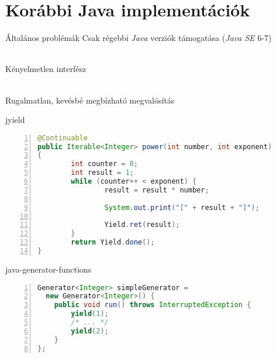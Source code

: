 \section{Korábbi Java implementációk}

\begin{frame}{Általános problémák}
Csak régebbi \textit{Java} verziók támogatása (\textit{Java SE} 6-7)


\hfill \\

\pause
Kényelmetlen interfész


\hfill \\

\pause
Rugalmatlan, kevésbé megbízható megvalósítás
\end{frame}


\begin{frame}[fragile]{jyield}
\begin{center}
\begin{lstlisting}[language=java, xleftmargin=15pt,
        basicstyle=\scriptsize,
        numbers=left,
        numbersep=5pt, escapechar=!]
@Continuable
public Iterable<Integer> power(int number, int exponent) 
{
        int counter = 0;
        int result = 1;
        while (counter++ < exponent) {
                result = result * number;

                System.out.print("[" + result + "]");

                Yield.ret(result);
        }
        return Yield.done();
}
\end{lstlisting}
\end{center}
\par
\end{frame}


\begin{frame}[fragile]{java-generator-functions}
\begin{center}
\begin{lstlisting}[language=java, xleftmargin=15pt,
        basicstyle=\scriptsize,
        numbers=left,
        numbersep=5pt, escapechar=!]
Generator<Integer> simpleGenerator = 
  new Generator<Integer>() {
    public void run() throws InterruptedException {
        yield(1);
        /* ... */
        yield(2);
    }
};
\end{lstlisting}
\end{center}
\par
\end{frame}


